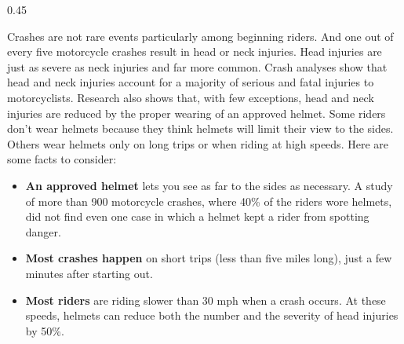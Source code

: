 \begin{langblock}{0.45} 
	\begin{eng}
	Crashes are not rare events particularly among beginning riders. And one out of every five motorcycle crashes result in head or neck injuries. Head injuries are just as severe as neck injuries and far more common. Crash analyses show that head and neck injuries account for a majority of serious and fatal injuries to motorcyclists. Research also shows that, with few exceptions, head and neck injuries are reduced by the proper wearing of an approved helmet.
	Some riders don't wear helmets because they think helmets will limit their view to the sides. Others wear helmets only on long trips or when riding at high speeds. Here are some facts to consider:
	\begin{itemize}
		\item \textbf{An approved helmet} lets you see as far to the sides as necessary. A study of more than 900 motorcycle crashes, where 40\% of the riders wore helmets, did not find even one case in which a helmet kept a rider from spotting danger.
		\item \textbf{Most crashes happen} on short trips (less than five miles long), just a few minutes after starting out.
		\item \textbf{Most riders} are riding slower than 30 mph when a crash occurs. At these speeds, helmets can reduce both the number and the severity of head injuries by 50\%.
	\end{itemize}
	

\end{eng}
\end{langblock}
